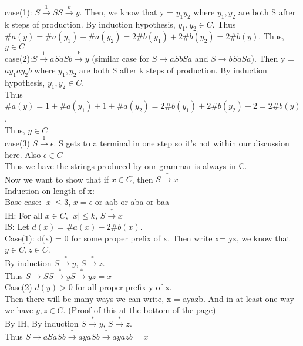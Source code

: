 \documentclass[12pt]{article}
\begin{document}
case(1): $S\xrightarrow{1} SS \xrightarrow{k} y$. Then, we know that y = $y_1y_2$ where $y_1,y_2$ are both S after k steps of production. By induction hypothesis, $y_1,y_2 \in C$. Thus $\#a(y) = \#a(y_1) + \#a(y_2) = 2\#b(y_1) + 2\#b(y_2)  = 2\#b(y)  $. Thus, $y\in C$\\

case(2):$S \xrightarrow{1}  aSaSb \xrightarrow{k} y$ (similar case for $ S \rightarrow aSbSa$ and $S \rightarrow bSaSa$). Then y = $ay_1ay_2b$ where $y_1,y_2$ are both S after k steps of production. By induction hypothesis, $y_1,y_2 \in C$. \\
Thus $\#a(y) = 1+\#a(y_1) +1+ \#a(y_2)= 2\#b(y_1) + 2\#b(y_2)  + 2= 2\#b(y)  $.\\
Thus, $y\in C$\\

case(3) $S \xrightarrow{1} \epsilon$. S gets to a terminal in one step so it's not within our discussion here. Also $\epsilon \in C$\\

Thus we have the strings produced by our grammar is always in C.\\

Now we want to show that if $x\in C$, then $S\xrightarrow{*} x$\\
Induction on length of x:\\
Base case: $|x| \le 3$, $x = \epsilon$ or aab or aba or baa\\
IH: For all $x\in C$, $|x| \le k$, $S\xrightarrow{*} x$\\
IS: Let $ d(x) = \#a(x) - 2\#b(x)$.\\

Case(1): d(x) = 0 for some proper prefix of x. Then write x= yz, we know that $y\in C,z\in C$.\\
By induction  $S\xrightarrow{*} y$,  $S\xrightarrow{*} z$.\\
Thus  $S\rightarrow SS \xrightarrow{*} yS \xrightarrow{*} yz = x$\\

\pagebreak
Case(2) $d(y) > 0$ for all proper prefix y of x.\\
Then there will be many ways we can write, x = ayazb. And in at least one way we have $y,z \in C$. (Proof of this at the bottom of the page)\\
By IH, By induction  $S\xrightarrow{*} y$,  $S\xrightarrow{*} z$.\\
Thus  $S\rightarrow aSaSb \xrightarrow{*} ayaSb \xrightarrow{*} ayazb = x$\\
\end{document}
